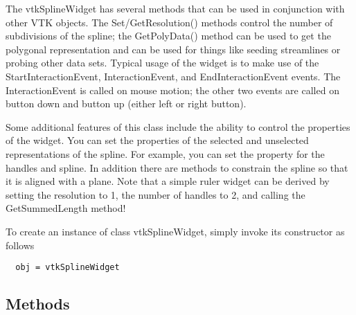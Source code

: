  The vtkSplineWidget has several methods that can be used in conjunction with
 other VTK objects. The Set/GetResolution() methods control the number of
 subdivisions of the spline; the GetPolyData() method can be used to get the
 polygonal representation and can be used for things like seeding
 streamlines or probing other data sets. Typical usage of the widget is to
 make use of the StartInteractionEvent, InteractionEvent, and
 EndInteractionEvent events. The InteractionEvent is called on mouse motion;
 the other two events are called on button down and button up (either left or
 right button).

 Some additional features of this class include the ability to control the
 properties of the widget. You can set the properties of the selected and
 unselected representations of the spline. For example, you can set the
 property for the handles and spline. In addition there are methods to
 constrain the spline so that it is aligned with a plane.  Note that a simple
 ruler widget can be derived by setting the resolution to 1, the number of
 handles to 2, and calling the GetSummedLength method!

To create an instance of class vtkSplineWidget, simply
invoke its constructor as follows
\begin{verbatim}
  obj = vtkSplineWidget
\end{verbatim}
\subsection{Methods}

